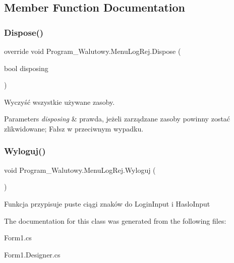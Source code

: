 \subsection{Member Function Documentation}
\mbox{\label{class_program___walutowy_1_1_menu_log_rej_af8df097779dee93338a05bc8c900342d}} 
\subsubsection{\texorpdfstring{Dispose()}{Dispose()}}
{\footnotesize\ttfamily override void Program\+\_\+\+Walutowy.\+Menu\+Log\+Rej.\+Dispose (\begin{DoxyParamCaption}\item[{bool}]{disposing }\end{DoxyParamCaption})\hspace{0.3cm}{\ttfamily [protected]}}



Wyczyść wszystkie używane zasoby. 


\begin{DoxyParams}{Parameters}
{\em disposing} & prawda, jeżeli zarządzane zasoby powinny zostać zlikwidowane; Fałsz w przeciwnym wypadku.\\
\hline
\end{DoxyParams}
\mbox{\label{class_program___walutowy_1_1_menu_log_rej_a22bdce7e6249bde0397ca4b132e6884b}} 
\subsubsection{\texorpdfstring{Wyloguj()}{Wyloguj()}}
{\footnotesize\ttfamily void Program\+\_\+\+Walutowy.\+Menu\+Log\+Rej.\+Wyloguj (\begin{DoxyParamCaption}{ }\end{DoxyParamCaption})}

Funkcja przypisuje puste ciągi znaków do Login\+Input i Haslo\+Input 

The documentation for this class was generated from the following files\+:\begin{DoxyCompactItemize}
\item 
Form1.\+cs\item 
Form1.\+Designer.\+cs\end{DoxyCompactItemize}
